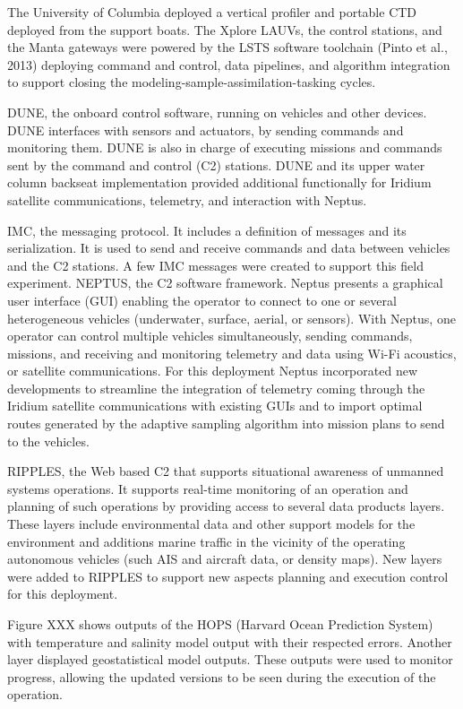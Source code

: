 The University of Columbia deployed a vertical profiler and portable CTD deployed from the support boats.
The Xplore LAUVs, the control stations, and the Manta gateways were powered by the LSTS software toolchain (Pinto et al., 2013) deploying command and control, data pipelines, and algorithm integration to support closing the modeling-sample-assimilation-tasking cycles. 

DUNE, the onboard control software, running on vehicles and other devices. DUNE interfaces with sensors and actuators, by sending commands and monitoring them. DUNE is also in charge of executing missions and commands sent by the command and control (C2) stations. DUNE and its upper water column backseat implementation provided additional functionally for Iridium satellite communications, telemetry, and interaction with Neptus. 

IMC, the messaging protocol. It includes a definition of messages and its serialization. It is used to send and receive commands and data between vehicles and the C2 stations. A few IMC messages were created to support this field experiment.
NEPTUS, the C2 software framework. Neptus presents a graphical user interface (GUI) enabling the operator to connect to one or several heterogeneous vehicles (underwater, surface, aerial, or sensors). With Neptus, one operator can control multiple vehicles simultaneously, sending commands, missions, and receiving and monitoring telemetry and data using Wi-Fi acoustics, or satellite communications. For this deployment Neptus incorporated new developments to streamline the integration of telemetry coming through the Iridium satellite communications with existing GUIs and to import optimal routes generated by the adaptive sampling algorithm into mission plans to send to the vehicles. 

RIPPLES, the Web based C2 that supports situational awareness of unmanned systems operations. It supports real-time monitoring of an operation and planning of such operations by providing access to several data products layers. These layers include environmental data and other support models for the environment and additions marine traffic in the vicinity of the operating autonomous vehicles (such AIS and aircraft data, or density maps). New layers were added to RIPPLES to support new aspects planning and execution control for this deployment. 

Figure XXX shows outputs of the HOPS (Harvard Ocean Prediction System) with temperature and salinity model output with their respected errors. Another layer displayed geostatistical model outputs. These outputs were used to monitor progress, allowing the updated versions to be seen during the execution of the operation.


